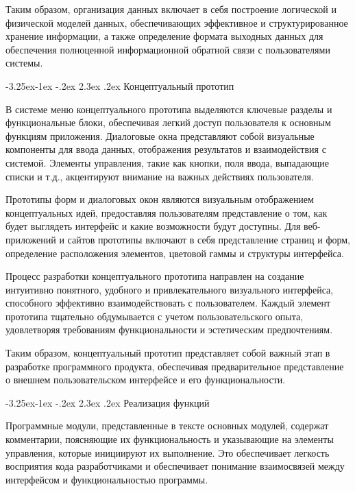 \documentclass[a4paper,draft]{report}
\makeatletter
\renewcommand\subsection{\@startsection{subsection}{2}{\z@}%
  {-3.25ex\@plus -1ex \@minus -.2ex}%
  {2.3ex \@plus .2ex}%
  {\normalfont\indent\bfseries}}
\makeatother
\begin{document}
Таким образом, организация данных включает в себя построение логической и физической моделей данных, обеспечивающих эффективное и структурированное хранение информации, а также определение формата выходных данных для обеспечения полноценной информационной обратной связи с пользователями системы.

\subsection{Концептуальный прототип}

В системе меню концептуального прототипа выделяются ключевые разделы и функциональные блоки, обеспечивая легкий доступ пользователя к основным функциям приложения.
Диалоговые окна представляют собой визуальные компоненты для ввода данных, отображения результатов и взаимодействия с системой.
Элементы управления, такие как кнопки, поля ввода, выпадающие списки и т.д., акцентируют внимание на важных действиях пользователя.

Прототипы форм и диалоговых окон являются визуальным отображением концептуальных идей, предоставляя пользователям представление о том, как будет выглядеть интерфейс и какие возможности будут доступны.
Для веб-приложений и сайтов прототипы включают в себя представление страниц и форм, определение расположения элементов, цветовой гаммы и структуры интерфейса.

Процесс разработки концептуального прототипа направлен на создание интуитивно понятного, удобного и привлекательного визуального интерфейса, способного эффективно взаимодействовать с пользователем.
Каждый элемент прототипа тщательно обдумывается с учетом пользовательского опыта, удовлетворяя требованиям функциональности и эстетическим предпочтениям.

Таким образом, концептуальный прототип представляет собой важный этап в разработке программного продукта, обеспечивая предварительное представление о внешнем пользовательском интерфейсе и его функциональности.

\subsection{Реализация функций}


Программные модули, представленные в тексте основных модулей, содержат комментарии, поясняющие их функциональность и указывающие на элементы управления, которые инициируют их выполнение.
Это обеспечивает легкость восприятия кода разработчиками и обеспечивает понимание взаимосвязей между интерфейсом и функциональностью программы.
\end{document}
